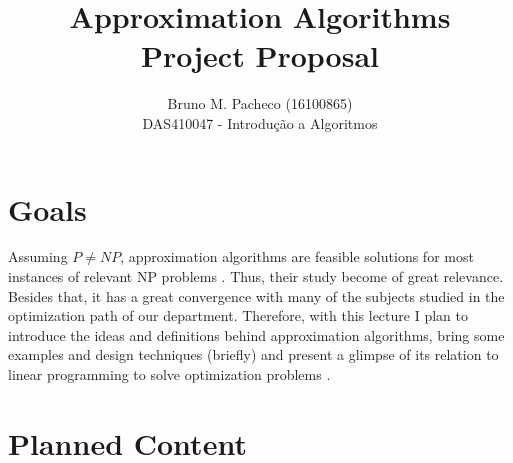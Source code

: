 \documentclass[a4paper]{report}
\begin{document}
 
\title{Approximation Algorithms\\Project Proposal}
\author{Bruno M. Pacheco (16100865)\\
DAS410047 - Introdução a Algoritmos}
 
\maketitle

\section*{Goals}

Assuming $P\neq NP$, approximation algorithms are feasible solutions for most instances of relevant NP problems \cite{10.5555/1614191}. Thus, their study become of great relevance. Besides that, it has a great convergence with many of the subjects studied in the optimization path of our department. Therefore, with this lecture I plan to introduce the ideas and definitions behind approximation algorithms, bring some examples and design techniques (briefly) \cite{Williamson2011} and present a glimpse of its relation to linear programming to solve optimization problems \cite{Johnson1974,10.5555/241938.241949}.

\section*{Planned Content}
\end{document}
